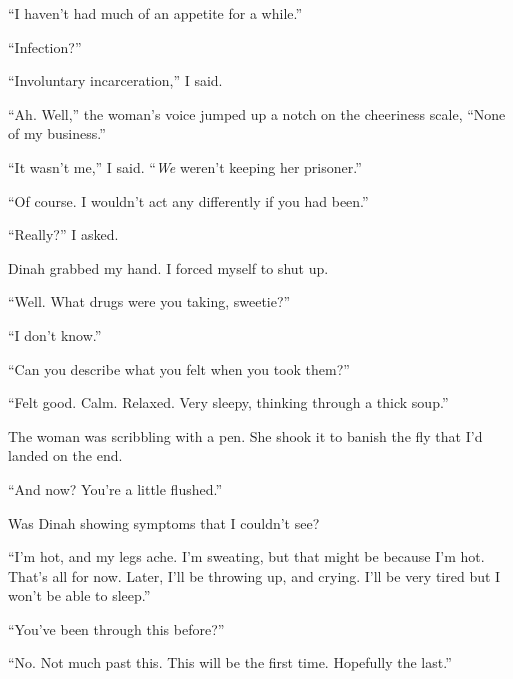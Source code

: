 ``I haven't had much of an appetite for a while.''



``Infection?''



``Involuntary incarceration,'' I said.



``Ah.  Well,'' the woman's voice jumped up a notch on the cheeriness scale, ``None of my business.''



``It wasn't me,'' I said.  ``\emph{We} weren't keeping her prisoner.''



``Of course.  I wouldn't act any differently if you had been.''



``Really?'' I asked.



Dinah grabbed my hand.  I forced myself to shut up.



``Well.  What drugs were you taking, sweetie?''



``I don't know.''



``Can you describe what you felt when you took them?''



``Felt good.  Calm.  Relaxed.  Very sleepy, thinking through a thick soup.''



The woman was scribbling with a pen.  She shook it to banish the fly that I'd landed on the end.



``And now?  You're a little flushed.''



Was Dinah showing symptoms that I couldn't see?



``I'm hot, and my legs ache.  I'm sweating, but that might be because I'm hot.  That's all for now.  Later, I'll be throwing up, and crying.  I'll be very tired but I won't be able to sleep.''



``You've been through this before?''



``No.  Not much past this.  This will be the first time.  Hopefully the last.''



